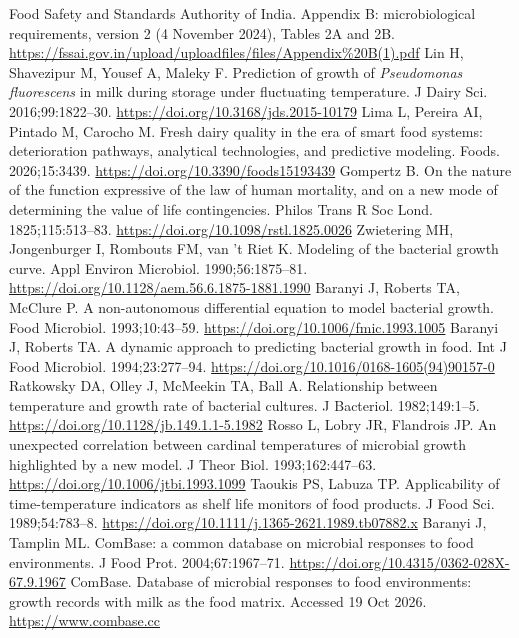  Food Safety and Standards Authority of India. Appendix B: microbiological requirements, version 2 (4 November 2024), Tables 2A and 2B. \url{https://fssai.gov.in/upload/uploadfiles/files/Appendix%20B(1).pdf}
 Lin H, Shavezipur M, Yousef A, Maleky F. Prediction of growth of \textit{Pseudomonas fluorescens} in milk during storage under fluctuating temperature. J Dairy Sci. 2016;99:1822--30. \url{https://doi.org/10.3168/jds.2015-10179}
 Lima L, Pereira AI, Pintado M, Carocho M. Fresh dairy quality in the era of smart food systems: deterioration pathways, analytical technologies, and predictive modeling. Foods. 2026;15:3439. \url{https://doi.org/10.3390/foods15193439}
 Gompertz B. On the nature of the function expressive of the law of human mortality, and on a new mode of determining the value of life contingencies. Philos Trans R Soc Lond. 1825;115:513--83. \url{https://doi.org/10.1098/rstl.1825.0026}
 Zwietering MH, Jongenburger I, Rombouts FM, van 't Riet K. Modeling of the bacterial growth curve. Appl Environ Microbiol. 1990;56:1875--81. \url{https://doi.org/10.1128/aem.56.6.1875-1881.1990}
 Baranyi J, Roberts TA, McClure P. A non-autonomous differential equation to model bacterial growth. Food Microbiol. 1993;10:43--59. \url{https://doi.org/10.1006/fmic.1993.1005}
 Baranyi J, Roberts TA. A dynamic approach to predicting bacterial growth in food. Int J Food Microbiol. 1994;23:277--94. \url{https://doi.org/10.1016/0168-1605(94)90157-0}
 Ratkowsky DA, Olley J, McMeekin TA, Ball A. Relationship between temperature and growth rate of bacterial cultures. J Bacteriol. 1982;149:1--5. \url{https://doi.org/10.1128/jb.149.1.1-5.1982}
 Rosso L, Lobry JR, Flandrois JP. An unexpected correlation between cardinal temperatures of microbial growth highlighted by a new model. J Theor Biol. 1993;162:447--63. \url{https://doi.org/10.1006/jtbi.1993.1099}
 Taoukis PS, Labuza TP. Applicability of time-temperature indicators as shelf life monitors of food products. J Food Sci. 1989;54:783--8. \url{https://doi.org/10.1111/j.1365-2621.1989.tb07882.x}
 Baranyi J, Tamplin ML. ComBase: a common database on microbial responses to food environments. J Food Prot. 2004;67:1967--71. \url{https://doi.org/10.4315/0362-028X-67.9.1967}
 ComBase. Database of microbial responses to food environments: growth records with milk as the food matrix. Accessed 19 Oct 2026. \url{https://www.combase.cc}
